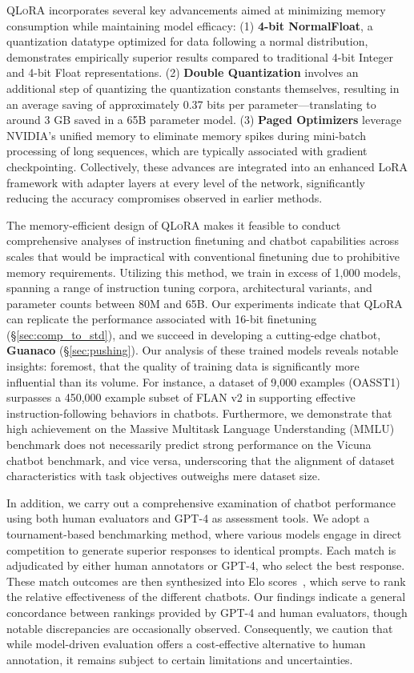 \textsc{QLoRA} incorporates several key advancements aimed at minimizing memory consumption while maintaining model efficacy: (1) \textbf{4-bit NormalFloat}, a quantization datatype optimized for data following a normal distribution, demonstrates empirically superior results compared to traditional 4-bit Integer and 4-bit Float representations. (2) \textbf{Double Quantization} involves an additional step of quantizing the quantization constants themselves, resulting in an average saving of approximately 0.37 bits per parameter—translating to around 3 GB saved in a 65B parameter model. (3) \textbf{Paged Optimizers} leverage NVIDIA’s unified memory to eliminate memory spikes during mini-batch processing of long sequences, which are typically associated with gradient checkpointing. Collectively, these advances are integrated into an enhanced LoRA framework with adapter layers at every level of the network, significantly reducing the accuracy compromises observed in earlier methods.

The memory-efficient design of \textsc{QLoRA} makes it feasible to conduct comprehensive analyses of instruction finetuning and chatbot capabilities across scales that would be impractical with conventional finetuning due to prohibitive memory requirements. Utilizing this method, we train in excess of 1,000 models, spanning a range of instruction tuning corpora, architectural variants, and parameter counts between 80M and 65B. Our experiments indicate that \textsc{QLoRA} can replicate the performance associated with 16-bit finetuning (\S\ref{sec:comp_to_std}), and we succeed in developing a cutting-edge chatbot, \textbf{Guanaco} (\S\ref{sec:pushing}). Our analysis of these trained models reveals notable insights: foremost, that the quality of training data is significantly more influential than its volume. For instance, a dataset of 9,000 examples (OASST1) surpasses a 450,000 example subset of FLAN v2 in supporting effective instruction-following behaviors in chatbots. Furthermore, we demonstrate that high achievement on the Massive Multitask Language Understanding (MMLU) benchmark does not necessarily predict strong performance on the Vicuna chatbot benchmark, and vice versa, underscoring that the alignment of dataset characteristics with task objectives outweighs mere dataset size.

In addition, we carry out a comprehensive examination of chatbot performance using both human evaluators and GPT-4 as assessment tools. We adopt a tournament-based benchmarking method, where various models engage in direct competition to generate superior responses to identical prompts. Each match is adjudicated by either human annotators or GPT-4, who select the best response. These match outcomes are then synthesized into Elo scores~\citep{elo1967proposed, elo1978rating}, which serve to rank the relative effectiveness of the different chatbots. Our findings indicate a general concordance between rankings provided by GPT-4 and human evaluators, though notable discrepancies are occasionally observed. Consequently, we caution that while model-driven evaluation offers a cost-effective alternative to human annotation, it remains subject to certain limitations and uncertainties.

